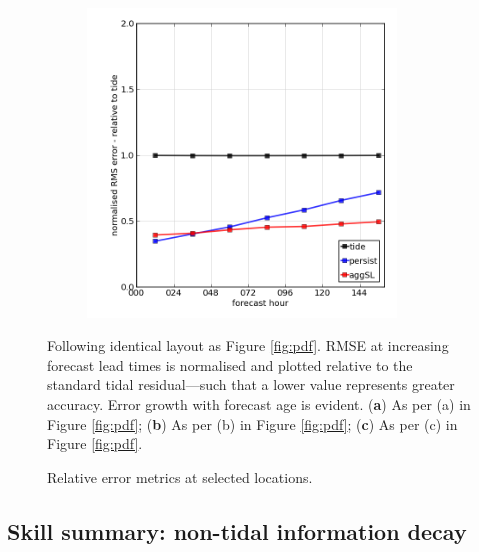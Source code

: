 \begin{figure}[!hbt]
\begin{subfigure}{0.30\textwidth}
    \caption{}
    \end{subfigure}
    \begin{subfigure}{0.30\textwidth}
    \includegraphics[width=0.9\textwidth]{figures/plots/0003_rms_growth.png}
    \caption{}
    \end{subfigure}
    
    \caption{Relative error metrics at selected locations.}
    {Following identical layout as Figure \ref{fig:pdf}. RMSE at increasing forecast lead times is normalised and plotted relative to the standard tidal residual---such that a lower value represents greater accuracy. Error growth with forecast age is evident. (\textbf{a}) As per (a) in Figure \ref{fig:pdf}; (\textbf{b}) As per (b) in Figure \ref{fig:pdf}; (\textbf{c}) As per (c) in Figure \ref{fig:pdf}.}
    \label{fig:rms}
\end{figure}   

\subsection{Skill summary: non-tidal information decay}
\label{sec:skill}

